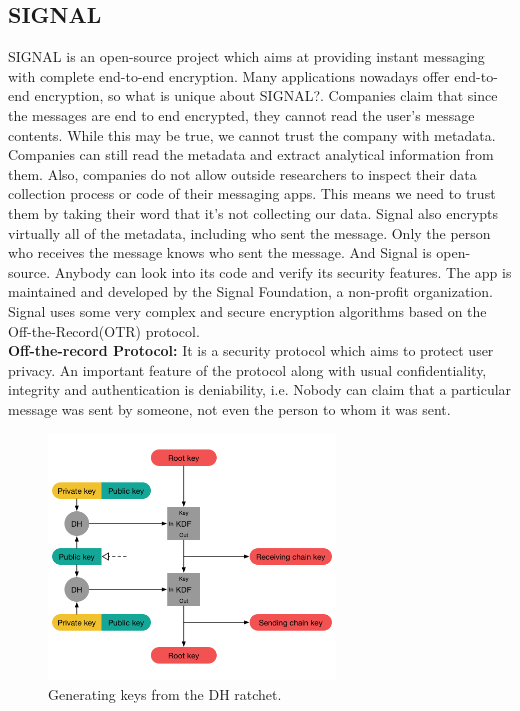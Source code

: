 \documentclass[11pt, conference, a4paper]{IEEEtran}
\begin{document}
\subsection{SIGNAL}
SIGNAL is an open-source project which aims at providing instant messaging with complete end-to-end encryption. Many applications nowadays offer end-to-end encryption, so what is unique about SIGNAL?. Companies claim that since the messages are end to end encrypted, they cannot read the user's message contents. While this may be true, we cannot trust the company with metadata.  Companies can still read the metadata and extract analytical information from them. Also, companies do not allow outside researchers to inspect their data collection process or code of their messaging apps. This means we need to trust them by taking their word that it's not collecting our data. Signal also encrypts virtually all of the metadata, including who sent the message. Only the person who receives the message knows who sent the message. And Signal is open-source. Anybody can look into its code and verify its security features. The app is maintained and developed by the Signal Foundation, a non-profit organization. Signal uses some very complex and secure encryption algorithms based on the Off-the-Record(OTR) protocol.\\
\textbf{Off-the-record Protocol:} It is a security protocol which aims to protect user privacy. An important feature of the protocol along with usual confidentiality, integrity and authentication is deniability, i.e. Nobody can claim that a particular message was sent by someone, not even the person to whom it was sent. 
\begin{figure}[H]
\begin{center}
  \includegraphics[width=3in]{double_ratchet.png}
  \caption{Generating keys from the DH ratchet.\cite{signalDoc}}
\end{center}
\end{figure}
\end{document}
